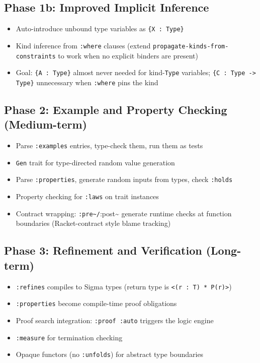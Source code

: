 \documentclass[11pt]{article}
\begin{document}
\subsection{Phase 1b: Improved Implicit Inference}
\label{sec:org84cbb25}

\begin{itemize}
\item Auto-introduce unbound type variables as \texttt{\{X : Type\}}
\item Kind inference from \texttt{:where} clauses (extend \texttt{propagate-kinds-from-constraints}
to work when no explicit binders are present)
\item Goal: \texttt{\{A : Type\}} almost never needed for kind-\texttt{Type} variables;
\texttt{\{C : Type -> Type\}} unnecessary when \texttt{:where} pins the kind
\end{itemize}
\subsection{Phase 2: Example and Property Checking (Medium-term)}
\label{sec:org42f4b34}

\begin{itemize}
\item Parse \texttt{:examples} entries, type-check them, run them as tests
\item \texttt{Gen} trait for type-directed random value generation
\item Parse \texttt{:properties}, generate random inputs from types, check \texttt{:holds}
\item Property checking for \texttt{:laws} on trait instances
\item Contract wrapping: \texttt{:pre\textasciitilde{}/}:post\textasciitilde{} generate runtime checks at function
boundaries (Racket-contract style blame tracking)
\end{itemize}
\subsection{Phase 3: Refinement and Verification (Long-term)}
\label{sec:orgb81e8ed}

\begin{itemize}
\item \texttt{:refines} compiles to Sigma types (return type is \texttt{<(r : T) * P(r)>})
\item \texttt{:properties} become compile-time proof obligations
\item Proof search integration: \texttt{:proof :auto} triggers the logic engine
\item \texttt{:measure} for termination checking
\item Opaque functors (no \texttt{:unfolds}) for abstract type boundaries
\end{itemize}
\end{document}
